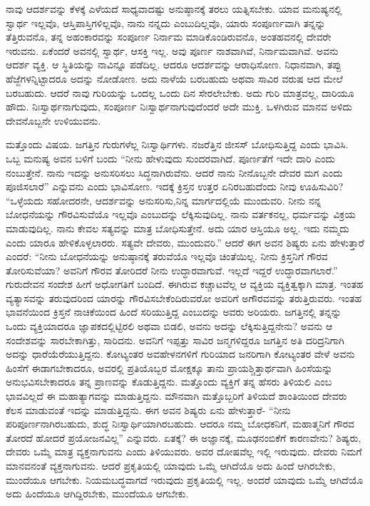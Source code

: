 ನಾವು ಆದರ್ಶವನ್ನು ಕೆಳಕ್ಕೆ ಎಳೆಯದೆ ಸಾಧ್ಯವಾದಷ್ಟು ಅನುಷ್ಠಾನಕ್ಕೆ ತರಲು ಯತ್ನಿಸಬೇಕು. ಯಾವ ಮನುಷ್ಯನಲ್ಲಿ ಸ್ವಾರ್ಥ ಇಲ್ಲವೊ, ಆಸ್ತಿಪಾಸ್ತಿಗಳಿಲ್ಲವೊ, ನಾನು ನನ್ನದು ಎಂಬುದಿಲ್ಲವೊ, ಯಾರು ಸಂಪೂರ್ಣವಾಗಿ ತನ್ನನ್ನು ತೆತ್ತಿರುವನೊ, ತನ್ನ ಅಹಂಕಾರವನ್ನು ಸಂಪೂರ್ಣ ನಿರ್ನಾಮ ಮಾಡಿಕೊಂಡಿರುವನೊ, ಅಂತಹವನಲ್ಲಿ ದೇವರೇ ಇರುವನು. ಏಕೆಂದರೆ ಅವನಲ್ಲಿ ಸ್ವಾರ್ಥ, ಆಸಕ್ತಿ ಇಲ್ಲ. ಅವು ಪೂರ್ಣ ನಾಶವಾಗಿವೆ, ನಿರ್ನಾಮ\-ವಾಗಿವೆ. ಅವನು ಆದರ್ಶ ವ್ಯಕ್ತಿ. ಆ ಸ್ಥಿತಿಯನ್ನು ನಾವಿನ್ನೂ ಪಡೆದಿಲ್ಲ. ಆದರೂ ಆದರ್ಶವನ್ನು ಆರಾಧಿಸೋಣ. ನಿಧಾನವಾಗಿ, ತಪ್ಪು ಹೆಜ್ಜೆಗಳನ್ನಿಟ್ಟಾದರೂ ಅದನ್ನು ನೋಡೋಣ. ಅದು ನಾಳೆಯೆ ಬರಬಹುದು ಅಥವಾ ಸಾವಿರ ವರುಷ ಆದ ಮೇಲೆ ಬರಬಹುದು. ಆದರೆ ನಾವು ಗುರಿಯನ್ನು ಒಂದಲ್ಲ ಒಂದು ದಿನ ಸೇರಲೇಬೇಕು. ಅದು ಗುರಿ ಮಾತ್ರವಲ್ಲ, ದಾರಿಯೂ ಹೌದು. ನಿಃಸ್ವಾರ್ಥನಾಗುವುದು, ಸಂಪೂರ್ಣ ನಿಃಸ್ವಾರ್ಥನಾಗುವುದೆಂದರೆ ಅದೇ ಮುಕ್ತಿ. ಒಳಗಿರುವ ಮಾನವ ಅಳಿದು ದೇವನೊಬ್ಬನೇ ಉಳಿಯುವನು.

ಮತ್ತೊಂದು ವಿಷಯ. ಜಗತ್ತಿನ ಗುರುಗಳೆಲ್ಲ ನಿಃಸ್ವಾರ್ಥಿಗಳು. ನಜರೆತ್ತಿನ ಜೀಸಸ್​ ಬೋಧಿಸುತ್ತಿದ್ದ ಎಂದು ಭಾವಿಸಿ. ಒಬ್ಬ ಮನುಷ್ಯ ಅವನ ಬಳಿಗೆ ಬಂದು “ನೀನು ಹೇಳುವುದು ಸುಂದರವಾಗಿದೆ. ಪೂರ್ಣತೆಗೆ ಇದೇ ದಾರಿ ಎಂದು ನಂಬುತ್ತೇನೆ. ನಾನು ಇದನ್ನು ಅನುಸರಿಸಲು ಸಿದ್ಧನಾಗಿರುವೆನು. ಆದರೆ ನಾನು ನೀನೊಬ್ಬನೇ ದೇವರ ಮಗ ಎಂದು ಪೂಜಿಸಲಾರೆ” ಎನ್ನುವನು ಎಂದು ಭಾವಿಸೋಣ. ಇದಕ್ಕೆ ಕ್ರಿಸ್ತನ ಉತ್ತರ ಏನಿರಬಹುದೆಂದು ನೀವು ಊಹಿಸುವಿರಿ? “ಒಳ್ಳೆಯದು ಸಹೋದರನೇ, ಆದರ್ಶವನ್ನು ಅನುಸರಿಸು,\break ನಿನ್ನ ಮಾರ್ಗದಲ್ಲಿಯೆ ಮುಂದುವರಿ. ನೀನು ನನ್ನ ಬೋಧನೆಯನ್ನು ಗೌರವಿಸುವೆಯೊ ಇಲ್ಲವೊ ಎಂಬುದನ್ನು ಲೆಕ್ಕಿಸುವುದಿಲ್ಲ. ನಾನು ವರ್ತಕನಲ್ಲ, ಧರ್ಮವನ್ನು ವಿಕ್ರಯ ಮಾಡುವುದಿಲ್ಲ. ನಾನು ಕೇವಲ ಸತ್ಯವನ್ನು ಮಾತ್ರ ಬೋಧಿಸುತ್ತೇನೆ. ಅದು ಯಾರ ಆಸ್ತಿಯೂ ಅಲ್ಲ. ಇದು ನಮ್ಮದು ಎಂದು ಯಾರೂ ಹೇಳಿಕೊಳ್ಳಲಾರರು. ಸತ್ಯವೇ ದೇವರು, ಮುಂದುವರಿ.” ಆದರೆ ಈಗ ಅವನ ಶಿಷ್ಯರು ಏನು ಹೇಳುತ್ತಾರೆ ಎಂದರೆ: “ನೀನು ಬೋಧನೆಯನ್ನು ಅನುಷ್ಠಾನಕ್ಕೆ ತರುವೆಯೊ ಇಲ್ಲವೊ ಚಿಂತೆಯಿಲ್ಲ. ನೀನು ಕ್ರಿಸ್ತನಿಗೆ ಗೌರವ ತೋರಿಸುವೆಯಾ? ಅವನಿಗೆ ಗೌರವ ತೋರಿದರೆ ನೀನು ಉದ್ಧಾರವಾಗುವೆ. ಇಲ್ಲದೆ ಇದ್ದರೆ ಉದ್ಧಾರವಾಗಲಾರೆ.” ಗುರುದೇವನ ಸಂದೇಶ ಹೀಗೆ ಅಧೋಗತಿಗೆ ಬಂದಿದೆ. ಈಗಿರುವ ಕಚ್ಚಾಟವೆಲ್ಲ ಆ ವ್ಯಕ್ತಿಯ ವ್ಯಕ್ತಿತ್ವಕ್ಕಾಗಿ ಮಾತ್ರ. ಇಂತಹ ವ್ಯತ್ಯಾಸವನ್ನು ತರುವುದರಿಂದ ಯಾರನ್ನು ಗೌರವಿಸಬೇಕೆಂದಿರುವರೋ ಅವರಿಗೆ ಅಗೌರವವನ್ನು ತರುತ್ತಿರುವರು. ಇಂತಹ ಭಾವನೆಯಿಂದ ಕ್ರಿಸ್ತನೆ ನಾಚಿಕೆಯಿಂದ ಹಿಂದೆ ಸರಿಯುತ್ತಿದ್ದ ಎಂಬುದನ್ನು ಅವರು ಅರಿಯರು. ಜಗತ್ತಿನಲ್ಲಿ ತನ್ನನ್ನು ಒಂದು ವ್ಯಕ್ತಿಯಾದರೂ ಜ್ಞಾಪಕದಲ್ಲಿಟ್ಟಿರಲಿ ಅಥವಾ ಬಿಡಲಿ, ಅವನು ಅದನ್ನು ಲೆಕ್ಕಿಸುತ್ತಿದ್ದನೇನು? ಅವನು ಆ ಸಂದೇಶವನ್ನು ಸಾರಬೇಕಾಗಿತ್ತು, ಸಾರಿದನು. ಅವನಿಗೆ ಇಪ್ಪತ್ತು ಸಾವಿರ ಜನ್ಮಗಳಿದ್ದರೂ ಜಗತ್ತಿನ ಅತಿ ದರಿದ್ರನಿಗಾಗಿ ಅದನ್ನು ಧಾರೆಯೆರೆಯುತ್ತಿದ್ದನು. ಕೋಟ್ಯಂತರ ಅವಹೇಳನಗಳಿಗೆ ಗುರಿಯಾದ ಜನರಿಗಾಗಿ ಕೋಟ್ಯಂತರ ವೇಳೆ ಅವನು ಹಿಂಸೆಗೆ ಈಡಾಗಬೇಕಾದರೂ, ಅವರಲ್ಲಿ ಪ್ರತಿಯೊಬ್ಬರ ಮೋಕ್ಷಕ್ಕೂ ತಾನು ಪ್ರಾಯಶ್ಚಿತ್ತಾರ್ಥವಾಗಿ ಹಿಂಸೆಯನ್ನು ಅನುಭವಿಸಬೇಕಾದರೂ ತನ್ನ ಪ್ರಾಣವನ್ನು ಕೊಡುತ್ತಿದ್ದನು. ಮತ್ತೊಂದು ವ್ಯಕ್ತಿಗೆ ತನ್ನ ಹೆಸರು ತಿಳಿಯಲಿ ಎಂಬ ಭಾವವಿಲ್ಲದೆ ಈ ಮಹಾತ್ಯಾಗವನ್ನು ಮಾಡುತ್ತಿದ್ದನು. ಮೌನವಾಗಿ ಮತ್ತೊಬ್ಬರಿಗೆ ತಿಳಿಯದೆ ಶಾಂತಿಯಿಂದ ದೇವರು ಕೆಲಸ ಮಾಡುವಂತೆ ಇದನ್ನು ಮಾಡುತ್ತಿದ್ದನು. ಈಗ ಅವನ ಶಿಷ್ಯರು ಏನು ಹೇಳುತ್ತಾರೆ- “ನೀನು ಪರಿಪೂರ್ಣನಾಗಿರಬಹುದು, ಶುದ್ಧ ನಿಃಸ್ವಾರ್ಥಿಯಾಗಿರಬಹುದು. ಆದರೂ ನಮ್ಮ ಬೋಧಕನಿಗೆ, ಮಹಾತ್ಮನಿಗೆ ಗೌರವ ತೋರದೆ ಹೋದರೆ ಪ್ರಯೋಜನವಿಲ್ಲ” ಎನ್ನುವರು. ಏತಕ್ಕೆ? ಈ ಅಜ್ಞಾನಕ್ಕೆ, ಮೂಢನಂಬಿಕೆಗೆ ಕಾರಣವೇನು? ಶಿಷ್ಯರು, ದೇವರು ಒಮ್ಮೆ ಮಾತ್ರ ವ್ಯಕ್ತನಾಗುವನು ಎಂದು ತಿಳಿಯುವರು. ಅವರ ದೋಷವೆಲ್ಲ ಇಲ್ಲಿ ಇರುವುದು. ದೇವರು ನಿಮಗೆ ಮಾನವನಂತೆ ವ್ಯಕ್ತನಾಗುವನು. ಆದರೆ ಪ್ರಕೃತಿಯಲ್ಲಿ ಯಾವುದು ಒಮ್ಮೆ ಆಗಿದೆಯೊ ಅದು ಹಿಂದೆ ಆಗಿರಬೇಕು, ಮುಂದೆಯೂ ಆಗಬೇಕು. ನಿಯಮಬದ್ಧವಾಗದೆ ಇರುವುದು ಪ್ರಕೃತಿಯಲ್ಲಿ ಇಲ್ಲ. ಅಂದರೆ ಯಾವುದು ಒಮ್ಮೆ ಆಗಿದೆಯೊ ಅದು ಹಿಂದೆಯೂ ಆಗಿದ್ದಿರಬೇಕು, ಮುಂದೆಯೂ ಆಗಬೇಕು.

